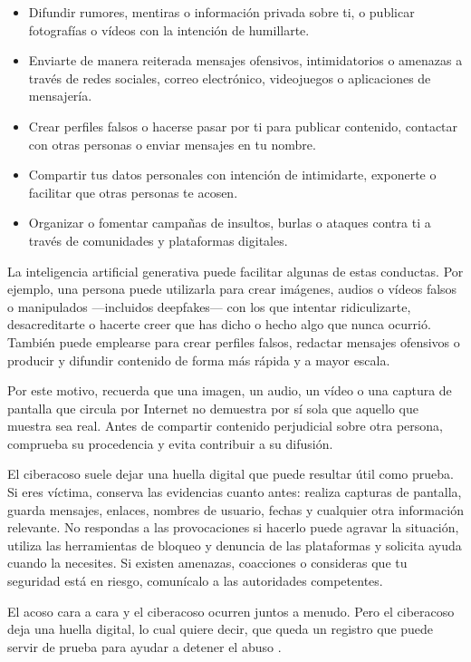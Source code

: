 \documentclass[
  spanish,
  a4paper,
  openany]{book}
\begin{document}
\begin{itemize}
\item
  Difundir rumores, mentiras o información privada sobre ti, o publicar fotografías o vídeos con la intención de humillarte.
\item
  Enviarte de manera reiterada mensajes ofensivos, intimidatorios o amenazas a través de redes sociales, correo electrónico, videojuegos o aplicaciones de mensajería.
\item
  Crear perfiles falsos o hacerse pasar por ti para publicar contenido, contactar con otras personas o enviar mensajes en tu nombre.
\item
  Compartir tus datos personales con intención de intimidarte, exponerte o facilitar que otras personas te acosen.
\item
  Organizar o fomentar campañas de insultos, burlas o ataques contra ti a través de comunidades y plataformas digitales.
\end{itemize}

La inteligencia artificial generativa puede facilitar algunas de estas conductas. Por ejemplo, una persona puede utilizarla para crear imágenes, audios o vídeos falsos o manipulados ---incluidos deepfakes--- con los que intentar ridiculizarte, desacreditarte o hacerte creer que has dicho o hecho algo que nunca ocurrió. También puede emplearse para crear perfiles falsos, redactar mensajes ofensivos o producir y difundir contenido de forma más rápida y a mayor escala.

Por este motivo, recuerda que una imagen, un audio, un vídeo o una captura de pantalla que circula por Internet no demuestra por sí sola que aquello que muestra sea real. Antes de compartir contenido perjudicial sobre otra persona, comprueba su procedencia y evita contribuir a su difusión.

El ciberacoso suele dejar una huella digital que puede resultar útil como prueba. Si eres víctima, conserva las evidencias cuanto antes: realiza capturas de pantalla, guarda mensajes, enlaces, nombres de usuario, fechas y cualquier otra información relevante. No respondas a las provocaciones si hacerlo puede agravar la situación, utiliza las herramientas de bloqueo y denuncia de las plataformas y solicita ayuda cuando la necesites. Si existen amenazas, coacciones o consideras que tu seguridad está en riesgo, comunícalo a las autoridades competentes.

El acoso cara a cara y el ciberacoso ocurren juntos a menudo. Pero el ciberacoso deja una huella digital, lo cual quiere decir, que queda un registro que puede servir de prueba para ayudar a detener el abuso \citep{UNICEF-ciberacoso}.
\end{document}
